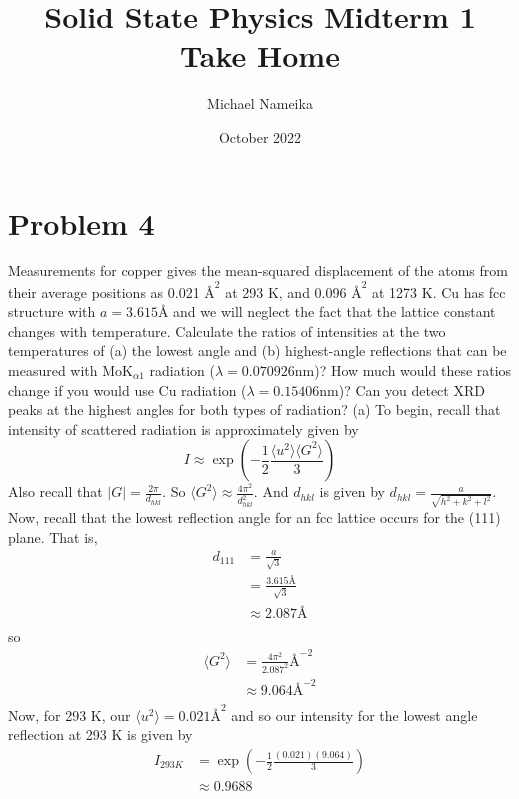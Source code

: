 \documentclass{article}
\title{Solid State Physics Midterm 1 Take Home}
\author{Michael Nameika}
\date{October 2022}
\begin{document}
\maketitle

\section*{Problem 4} Measurements for copper gives the mean-squared displacement of the atoms from their average positions as 0.021 $\text{\AA}^2$ at 293 K, and 0.096 $\text{\AA}^2$ at 1273 K. 
Cu has fcc structure with $a = 3.615 \text{\AA}$ and we will neglect the fact that the lattice constant changes with temperature. 
Calculate the ratios of intensities at the two temperatures of (a) the lowest angle and (b) highest-angle reflections that can be measured with Mo$\text{K}_{\alpha1}$ radiation ($\lambda = 0.070926 \text{nm}$)? 
How much would these ratios change if you would use Cu radiation ($\lambda = 0.15406 \text{nm}$)?
Can you detect XRD peaks at the highest angles for both types of radiation?
\newline\newline
(a) To begin, recall that intensity of scattered radiation is approximately given by
\[I \approx \exp{\left(-\frac{1}{2}\frac{\langle u^2 \rangle \langle G^2 \rangle}{3}\right)}\]
Also recall that $|G| = \frac{2\pi}{d_{hkl}}$. So $\langle G^2 \rangle \approx \frac{4\pi^2}{d^2_{hkl}}$. And $d_{hkl}$ is given by $d_{hkl} = \frac{a}{\sqrt{h^2 + k^2 + l^2}}$. Now, recall that the lowest reflection angle for an fcc lattice occurs for the (111) plane. That is,
\begin{align*}
    d_{111} &= \frac{a}{\sqrt{3}} \\
    &= \frac{3.615 \text{\AA}}{\sqrt{3}} \\
    &\approx 2.087 \text{\AA} \\
\end{align*}
so
\begin{align*}
    \langle G^2 \rangle &= \frac{4\pi^2}{2.087^2} \text{\AA}^{-2} \\
    &\approx 9.064 \text{\AA}^{-2} \\
\end{align*}
Now, for 293 K, our $\langle u^2 \rangle = 0.021 \text{\AA}^2$ and so our intensity for the lowest angle reflection at 293 K is given by
\begin{align*}
    I_{293K} &= \exp{\left(-\frac{1}{2}\frac{(0.021)(9.064)}{3}\right)} \\
    &\approx 0.9688 \\
\end{align*}
\end{document}
